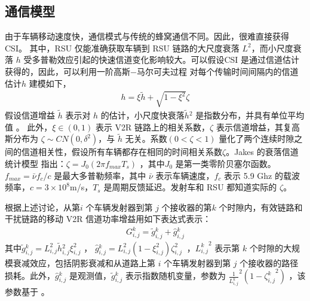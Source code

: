 \subsection{通信模型}\label{section3-2-1}
由于车辆移动速度快，通信模式与传统的蜂窝通信不同。因此，很难直接获得 CSI。 其中，RSU 仅能准确获取车辆到 RSU 链路的大尺度衰落 $L^2$，而小尺度衰落 $h$ 受多普勒效应引起的快速信道变化影响较大。可以假设CSI 是通过信道估计获得的，因此，可以利用一阶高斯$-$马尔可夫过程 \supercite{Kim2011} 对每个传输时间间隔内的信道估计$h$ 建模如下，%
\begin{eqnarray}\label{E1}
h=\xi{\widetilde{h}}+\sqrt{1-\xi^2}\zeta
\end{eqnarray}
假设信道增益 $\widetilde{h}$ 表示对 $h$ 的估计，小尺度快衰落${\widetilde{h}}\phantom{}^2$ 是指数分布，并具有单位平均值 \supercite{Sakr2014}。 此外，$\xi\in\left(0,1\right)$ 表示 V2R 链路上的相关系数，$\zeta$ 表示信道增益，其复高斯分布为 $\zeta\sim CN\left(0,\delta^2\right)$，与 $\widetilde{h}$ 无关。系数$\left(0<\zeta<1\right)$ 量化了两个连续时隙之间的信道相关性，假设所有车辆都存在相同的时间相关系数$\zeta$。Jakes 的衰落信道统计模型 \supercite{Kim2011} 指出：$\zeta=J_0\left(2\pi f_{max}T_s\right)$ ，其中$J_0$ 是第一类零阶贝塞尔函数。$f_{max}=\bar{\nu}f_c/c $ 是最大多普勒频率，其中 $\bar{\nu}$ 表示车辆速度，$f_c$ 表示 5.9 Ghz 的载波频率，$c=3\times{10}^8$m/s，$T_s$ 是周期反馈延迟。发射车和 RSU 都知道实际的 $\zeta$。

根据上述讨论，从第$ i$ 个车辆发射器到第 $j $ 个接收器的第$ k $ 个时隙内，有效链路和干扰链路的移动 V2R 信道功率增益用如下表达式表示：
\begin{eqnarray}\label{E2}
G_{i,j}^k={\widetilde{g}}\phantom{}_{i,j}^k+{\hat{g}}\phantom{}_{i,j}^k
\end{eqnarray}
其中${\widetilde{g}}\phantom{}_{i,j}^k=L_{i,j}^2{\widetilde{h}}\phantom{}_{i,j}^2\xi_{i,j}^2$ ， ${\hat{g}}\phantom{}_{i,j}^k=L_{i,j}^2\left(1-\xi_{i,j}^2\right)\zeta_{i,j}^2\ $ ，$ {L_{i,j}^k}^2 $
表示第 $k $ 个时隙的大规模衰减效应，包括阴影衰减和从道路上第 $i$ 个车辆发射器到第 $ j $ 个接收器的路径损耗。此外，${\hat{g}}\phantom{}_{i,j}^k$ 是观测值，${\widetilde{g}}\phantom{}_{i,j}^k$ 表示指数随机变量，参数为 $\frac{1}{L_{i,j}^k}^2({1-{\zeta_{i,j}^k}^2}) $ ，该参数基于 \cite{Xie2020}。

